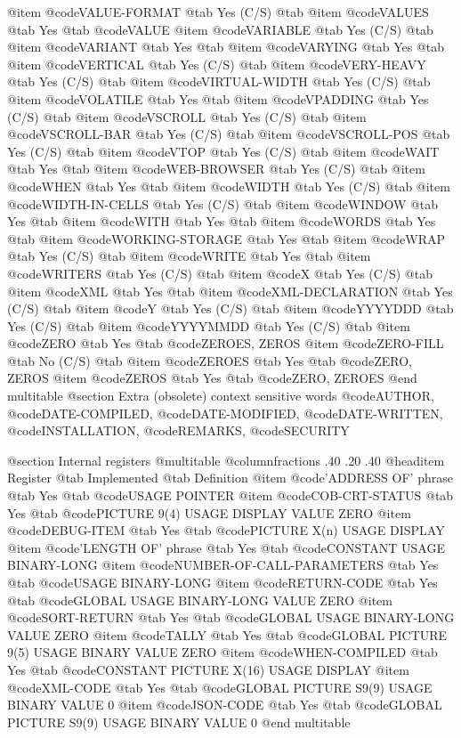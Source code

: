 @item @code{VALUE-FORMAT} @tab Yes	(C/S) @tab 
@item @code{VALUES} @tab Yes @tab @code{VALUE}
@item @code{VARIABLE} @tab Yes	(C/S) @tab 
@item @code{VARIANT} @tab Yes @tab 
@item @code{VARYING} @tab Yes @tab 
@item @code{VERTICAL} @tab Yes	(C/S) @tab 
@item @code{VERY-HEAVY} @tab Yes	(C/S) @tab 
@item @code{VIRTUAL-WIDTH} @tab Yes	(C/S) @tab 
@item @code{VOLATILE} @tab Yes @tab 
@item @code{VPADDING} @tab Yes	(C/S) @tab 
@item @code{VSCROLL} @tab Yes	(C/S) @tab 
@item @code{VSCROLL-BAR} @tab Yes	(C/S) @tab 
@item @code{VSCROLL-POS} @tab Yes	(C/S) @tab 
@item @code{VTOP} @tab Yes	(C/S) @tab 
@item @code{WAIT} @tab Yes @tab 
@item @code{WEB-BROWSER} @tab Yes	(C/S) @tab 
@item @code{WHEN} @tab Yes @tab 
@item @code{WIDTH} @tab Yes	(C/S) @tab 
@item @code{WIDTH-IN-CELLS} @tab Yes	(C/S) @tab 
@item @code{WINDOW} @tab Yes @tab 
@item @code{WITH} @tab Yes @tab 
@item @code{WORDS} @tab Yes @tab 
@item @code{WORKING-STORAGE} @tab Yes @tab 
@item @code{WRAP} @tab Yes	(C/S) @tab 
@item @code{WRITE} @tab Yes @tab 
@item @code{WRITERS} @tab Yes	(C/S) @tab 
@item @code{X} @tab Yes	(C/S) @tab 
@item @code{XML} @tab Yes @tab 
@item @code{XML-DECLARATION} @tab Yes	(C/S) @tab 
@item @code{Y} @tab Yes	(C/S) @tab 
@item @code{YYYYDDD} @tab Yes	(C/S) @tab 
@item @code{YYYYMMDD} @tab Yes	(C/S) @tab 
@item @code{ZERO} @tab Yes @tab @code{ZEROES, ZEROS}
@item @code{ZERO-FILL} @tab No	(C/S) @tab 
@item @code{ZEROES} @tab Yes @tab @code{ZERO, ZEROS}
@item @code{ZEROS} @tab Yes @tab @code{ZERO, ZEROES}
@end multitable
@section Extra (obsolete) context sensitive words
@code{AUTHOR}, @code{DATE-COMPILED}, @code{DATE-MODIFIED}, @code{DATE-WRITTEN}, @code{INSTALLATION}, @code{REMARKS}, @code{SECURITY}

@section Internal registers
@multitable @columnfractions .40 .20 .40
@headitem Register @tab Implemented @tab Definition
@item @code{'ADDRESS OF' phrase} @tab Yes @tab @code{USAGE POINTER}
@item @code{COB-CRT-STATUS} @tab Yes @tab @code{PICTURE 9(4) USAGE DISPLAY VALUE ZERO}
@item @code{DEBUG-ITEM} @tab Yes @tab @code{PICTURE X(n) USAGE DISPLAY}
@item @code{'LENGTH OF' phrase} @tab Yes @tab @code{CONSTANT USAGE BINARY-LONG}
@item @code{NUMBER-OF-CALL-PARAMETERS} @tab Yes @tab @code{USAGE BINARY-LONG}
@item @code{RETURN-CODE} @tab Yes @tab @code{GLOBAL USAGE BINARY-LONG VALUE ZERO}
@item @code{SORT-RETURN} @tab Yes @tab @code{GLOBAL USAGE BINARY-LONG VALUE ZERO}
@item @code{TALLY} @tab Yes @tab @code{GLOBAL PICTURE 9(5) USAGE BINARY VALUE ZERO}
@item @code{WHEN-COMPILED} @tab Yes @tab @code{CONSTANT PICTURE X(16) USAGE DISPLAY}
@item @code{XML-CODE} @tab Yes @tab @code{GLOBAL PICTURE S9(9) USAGE BINARY VALUE 0}
@item @code{JSON-CODE} @tab Yes @tab @code{GLOBAL PICTURE S9(9) USAGE BINARY VALUE 0}
@end multitable
